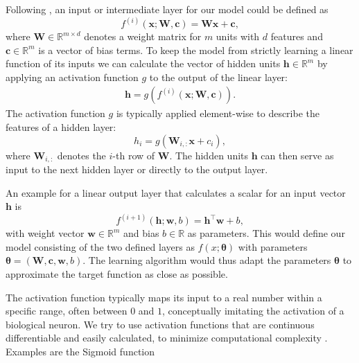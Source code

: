 Following \cite{Goodfellow-et-al-2016}, an input or intermediate layer for our model could be defined as
\begin{equation}
    f^{(i)}(\mathbf{x}; \mathbf{W},\mathbf{c})=\mathbf{W}\mathbf{x}+\mathbf{c},
\end{equation}
where $\mathbf{W} \in \mathbb{R}^{m\times d}$ denotes a weight matrix for $m$ units with $d$ features and $\mathbf{c}\in \mathbb{R}^m$ is a vector of bias terms.
To keep the model from strictly learning a linear function of its inputs we can calculate the vector of hidden units $\mathbf{h} \in \mathbb{R}^m$ by applying an activation function $g$ to the output of the linear layer:
\begin{align}
    \mathbf{h} = g(f^{(i)}(\mathbf{x}; \mathbf{W},\mathbf{c})).
\end{align}
The activation function $g$ is typically applied element-wise to describe the features of a hidden layer:
\begin{equation}
    h_i = g(\mathbf{W}_{i,:}\mathbf{x}+c_i),
\end{equation}
where $\mathbf{W}_{i,:}$ denotes the $i$-th row of $\mathbf{W}$.
The hidden units $\mathbf{h}$ can then serve as input to the next hidden layer or directly to the output layer.

An example for a linear output layer that calculates a scalar for an input vector $\mathbf{h}$ is
\begin{equation}
    f^{(i+1)}(\mathbf{h}; \mathbf{w},b)=\mathbf{h}^\top\mathbf{w}+b,
\end{equation}
with weight vector $\mathbf{w} \in \mathbb{R}^m$ and bias $b \in \mathbb{R}$ as parameters. This would define our model consisting of the two defined layers as $f(x;\boldsymbol{\theta})$ with parameters $\boldsymbol{\theta} = (\mathbf{W}, \mathbf{c}, \mathbf{w}, b)$. The learning algorithm would thus adapt the parameters $\boldsymbol{\theta}$ to approximate the target function as close as possible.

The activation function typically maps its input to a real number within a specific range, often between $0$ and $1$, conceptually imitating the activation of a biological neuron. We try to use activation functions that are continuous differentiable and easily calculated, to minimize computational complexity \cite{Liu2020}. Examples are the Sigmoid function


